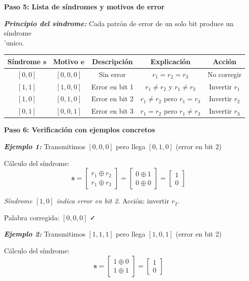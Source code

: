\documentclass[11pt,a4paper]{article}
\begin{document}
\textbf{Paso 5: Lista de s\'indromes y motivos de error}

\textit{\textbf{Principio del s\'indrome:}} Cada patr\'on de error de un solo bit produce un s\'indrome \\'unico.

\begin{center}
\begin{tabular}{|c|c|c|c|c|}
\hline
\textbf{S\'indrome $\mathbf{s}$} & \textbf{Motivo $\mathbf{e}$} & \textbf{Descripci\'on} & \textbf{Explicaci\'on} & \textbf{Acci\'on} \\
\hline
$[0, 0]$ & $[0, 0, 0]$ & Sin error & $r_1 = r_2 = r_3$ & No corregir \\
\hline
$[1, 1]$ & $[1, 0, 0]$ & Error en bit 1 & $r_1 \neq r_2$ y $r_1 \neq r_3$ & Invertir $r_1$ \\
\hline
$[1, 0]$ & $[0, 1, 0]$ & Error en bit 2 & $r_1 \neq r_2$ pero $r_1 = r_3$ & Invertir $r_2$ \\
\hline
$[0, 1]$ & $[0, 0, 1]$ & Error en bit 3 & $r_1 = r_2$ pero $r_1 \neq r_3$ & Invertir $r_3$ \\
\hline
\end{tabular}
\end{center}

\textbf{Paso 6: Verificaci\'on con ejemplos concretos}

\textit{\textbf{Ejemplo 1:}} Transmitimos $[0,0,0]$ pero llega $[0,1,0]$ (error en bit 2)

C\'alculo del s\'indrome:
\[
\mathbf{s} = \begin{bmatrix}
r_1 \oplus r_2 \\
r_1 \oplus r_3
\end{bmatrix} = \begin{bmatrix}
0 \oplus 1 \\
0 \oplus 0
\end{bmatrix} = \begin{bmatrix}
1 \\
0
\end{bmatrix}
\]

\textit{S\'indrome $[1,0]$ indica error en bit 2.} Acci\'on: invertir $r_2$.

Palabra corregida: $[0,0,0]$ ✓

\vspace{0.3cm}

\textit{\textbf{Ejemplo 2:}} Transmitimos $[1,1,1]$ pero llega $[1,0,1]$ (error en bit 2)

C\'alculo del s\'indrome:
\[
\mathbf{s} = \begin{bmatrix}
1 \oplus 0 \\
1 \oplus 1
\end{bmatrix} = \begin{bmatrix}
1 \\
0
\end{bmatrix}
\]
\end{document}
